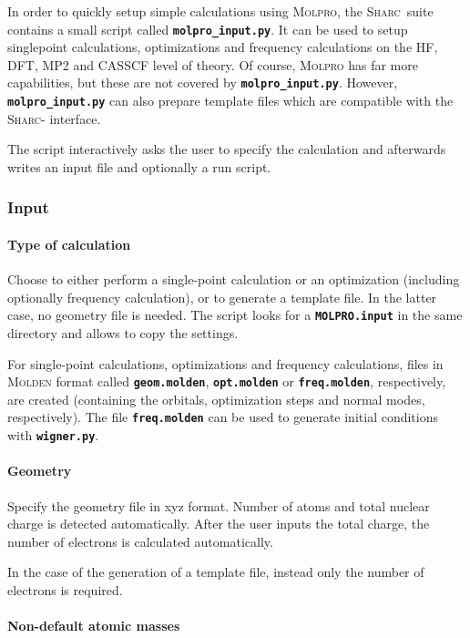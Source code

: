 \documentclass[a4paper,11pt,DIV=15,openany,twoside=false]{scrbook}
\newcommand{\sharc}{\textsc{Sharc}}
\newcommand{\ttt}[1]{\textbf{\texttt{#1}}}
\begin{document}
In order to quickly setup simple calculations using \textsc{Molpro}, the \sharc\ suite contains a small script called \ttt{molpro\_input.py}. It can be used to setup singlepoint calculations, optimizations and frequency calculations on the HF, DFT, MP2 and CASSCF level of theory. Of course, \textsc{Molpro} has far more capabilities, but these are not covered by \ttt{molpro\_input.py}. However, \ttt{molpro\_input.py} can also prepare template files which are compatible with the \sharc- interface.

The script interactively asks the user to specify the calculation and afterwards writes an input file and optionally a run script.

\subsubsection{Input}

\paragraph{Type of calculation}

Choose to either perform a single-point calculation or an optimization (including optionally frequency calculation), or to generate a template file. In the latter case, no geometry file is needed. The script looks for a \ttt{MOLPRO.input} in the same directory and allows to copy the settings. 

For single-point calculations, optimizations and frequency calculations, files in \textsc{Molden} format called \ttt{geom.molden}, \ttt{opt.molden} or \ttt{freq.molden}, respectively, are created (containing the orbitals, optimization steps and normal modes, respectively). The file \ttt{freq.molden} can be used to generate initial conditions with \ttt{wigner.py}.

\paragraph{Geometry}

Specify the geometry file in xyz format. Number of atoms and total nuclear charge is detected automatically. After the user inputs the total charge, the number of electrons is calculated automatically.

In the case of the generation of a template file, instead only the number of electrons is required.

\paragraph{Non-default atomic masses}
\end{document}
